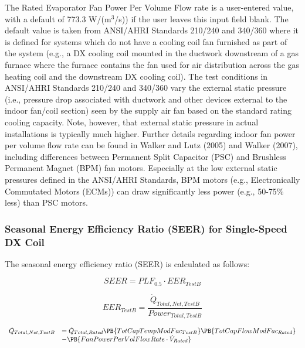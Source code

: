 The Rated Evaporator Fan Power Per Volume Flow rate is a user-entered value, with a default of 773.3 W/(m\(^{3}\)/s)) if the user leaves this input field blank. The default value is taken from ANSI/AHRI Standards 210/240 and 340/360 where it is defined for systems which do not have a cooling coil fan furnished as part of the system (e.g., a DX cooling coil mounted in the ductwork downstream of a gas furnace where the furnace contains the fan used for air distribution across the gas heating coil and the downstream DX cooling coil). The test conditions in ANSI/AHRI Standards 210/240 and 340/360 vary the external static pressure (i.e., pressure drop associated with ductwork and other devices external to the indoor fan/coil section) seen by the supply air fan based on the standard rating cooling capacity. Note, however, that external static pressure in actual installations is typically much higher. Further details regarding indoor fan power per volume flow rate can be found in Walker and Lutz (2005) and Walker (2007), including differences between Permanent Split Capacitor (PSC) and Brushless Permanent Magnet (BPM) fan motors. Especially at the low external static pressures defined in the ANSI/AHRI Standards, BPM motors (e.g., Electronically Commutated Motors (ECMs)) can draw significantly less power (e.g., 50-75\% less) than PSC motors.

\subsubsection{Seasonal Energy Efficiency Ratio (SEER) for Single-Speed DX Coil}\label{seasonal-energy-efficiency-ratio-seer-for-single-speed-dx-coil}

The seasonal energy efficiency ratio (SEER) is calculated as follows:

\begin{equation}
SEER = PL{F_{0.5}} \cdot EE{R_{TestB}}
\end{equation}

\begin{equation}
EE{R_{TestB}} = \frac{{{{\dot Q}_{Total,Net,TestB}}}}{{Powe{r_{Total,TestB}}}}
\end{equation}

\begin{equation}
  \begin{array}{rl}
    \dot{Q}_{Total,Net,TestB} &= \dot{Q}_{Total,Rated} \PB{TotCapTempModFac_{TestB}}\PB{TotCapFlowModFac_{Rated}} \\
                              &- \PB{FanPowerPerVolFlowRate \cdot \dot{V}_{Rated}}
  \end{array}
\end{equation}

